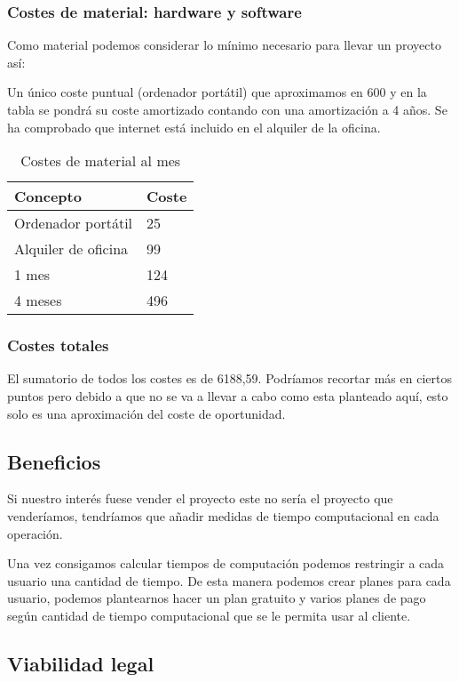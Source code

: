 \subsubsection{Costes de material: hardware y software}

Como material podemos considerar lo mínimo necesario para llevar un proyecto así:

Un único coste puntual (ordenador portátil) que aproximamos en 600 y en la tabla se pondrá su coste amortizado contando con una amortización a 4 años. Se ha comprobado que internet está incluido en el alquiler de la oficina.

\begin{table}[]
\centering
\caption{Costes de material al mes}
\label{Costes mensualmente}
\begin{tabular}{@{}ll@{}}
\toprule
Concepto & Coste \\ \midrule
Ordenador portátil & 25 \\
Alquiler de oficina & 99 \\
1 mes & 124 \\ \midrule
4 meses  & 496 \\ \bottomrule
\end{tabular}
\end{table}


\subsubsection{Costes totales}
El sumatorio de todos los costes es de 6188,59. Podríamos recortar más en ciertos puntos pero debido a que no se va a llevar a cabo como esta planteado aquí, esto solo es una aproximación del coste de oportunidad.




\subsection{Beneficios}
Si nuestro interés fuese vender el proyecto este no sería el proyecto que venderíamos, tendríamos que añadir medidas de tiempo computacional en cada operación.

Una vez consigamos calcular tiempos de computación podemos restringir a cada usuario una cantidad de tiempo. De esta manera podemos crear planes para cada usuario, podemos plantearnos hacer un plan gratuito y varios planes de pago según cantidad de tiempo computacional que se le permita usar al cliente. 


\subsection{Viabilidad legal}


